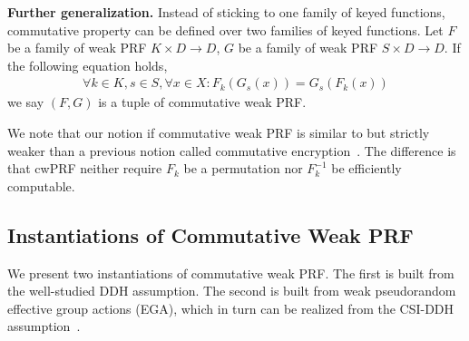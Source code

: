 \documentclass[a4paper,10pt]{article}
\begin{document}
\begin{trivlist}
\item \textbf{Further generalization.} Instead of sticking to one family of keyed functions, 
    commutative property can be defined over two families of keyed functions.   
    Let $F$ be a family of weak PRF $K \times D \rightarrow D$, 
    $G$ be a family of weak PRF $S \times D \rightarrow D$. If the following equation holds, 
\begin{gather*}
\forall k \in K, s \in S, \forall x \in X: F_k(G_s(x)) = G_s(F_k(x)) 
\end{gather*}
we say $(F, G)$ is a tuple of commutative weak PRF.  
\end{trivlist}

We note that our notion if commutative weak PRF is similar to but strictly weaker than a previous notion 
called commutative encryption~\cite{AES-SIGMOD-2003}. 
The difference is that cwPRF neither require $F_k$ be a permutation nor $F_k^{-1}$ be efficiently computable. 

\subsection{Instantiations of Commutative Weak PRF}
We present two instantiations of commutative weak PRF. 
The first is built from the well-studied DDH assumption. 
The second is built from weak pseudorandom effective group actions (EGA), 
which in turn can be realized from the CSI-DDH assumption~\cite{KGV-SAC-2020}.  
\end{document}
